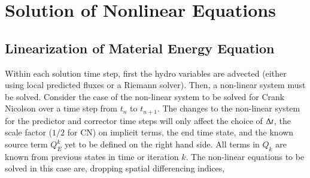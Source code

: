\section{Solution of Nonlinear Equations}
\subsection{Linearization of Material Energy Equation}\label{sec:linearization}

Within each solution time step, first the hydro variables are advected (either
using local predicted fluxes or a Riemann solver).  Then, a non-linear system
must be solved.  Consider the case of the non-linear system to be solved for
Crank Nicolson over a time step from $t_n$ to $t_{n+1}$.  The changes to the
non-linear system for the predictor and corrector time steps will only affect
the choice of $\Delta t$, the scale factor ($1/2$ for CN) on implicit terms, the end
time state, and the known source term $Q_E^k$ yet to be defined on the right
hand side. All terms in $Q_k$ are known from previous states in time or
iteration $k$.  The non-linear equations to be solved in this case are,
dropping spatial differencing indices,


